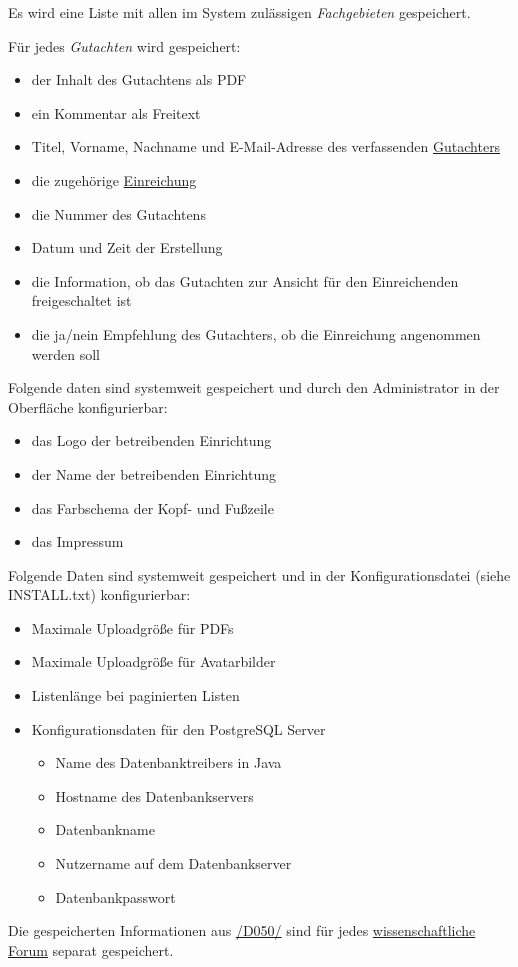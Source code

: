 \begin{description}
	 Es wird eine Liste mit allen im System zulässigen \emph{Fachgebieten} gespeichert.

	 Für jedes \emph{Gutachten} wird gespeichert:
	\begin{itemize}
		\item der Inhalt des Gutachtens als PDF
		\item ein Kommentar als Freitext
		\item Titel, Vorname, Nachname und E-Mail-Adresse des verfassenden \hyperref[funkt:Gutachter]{Gutachters}
		\item die zugehörige \hyperref[d025]{Einreichung}
		\item die Nummer des Gutachtens
		\item Datum und Zeit der Erstellung
		\item die Information, ob das Gutachten zur Ansicht für den Einreichenden freigeschaltet ist
		\item die ja/nein Empfehlung des Gutachters, ob die Einreichung angenommen werden soll
	\end{itemize}

	 Folgende daten sind systemweit gespeichert und durch den Administrator in der Oberfläche konfigurierbar:
	\begin{itemize}
		\item das Logo der betreibenden Einrichtung
		\item der Name der betreibenden Einrichtung
		\item das Farbschema der Kopf- und Fußzeile
		\item das Impressum
	\end{itemize}

	 Folgende Daten sind systemweit gespeichert und in der Konfigurationsdatei (siehe INSTALL.txt) konfigurierbar:
	\begin{itemize}
		\item Maximale Uploadgröße für PDFs
		\item Maximale Uploadgröße für Avatarbilder
		\item Listenlänge bei paginierten Listen
		\item Konfigurationsdaten für den PostgreSQL Server
		\begin{itemize}
			\item Name des Datenbanktreibers in Java
			\item Hostname des Datenbankservers
			\item Datenbankname
			\item Nutzername auf dem Datenbankserver
			\item Datenbankpasswort
		\end{itemize}
	\end{itemize}

	 Die gespeicherten Informationen aus \hyperref[d050]{/D050/} sind für jedes \hyperref[d030]{wissenschaftliche Forum} separat gespeichert.
\end{description}